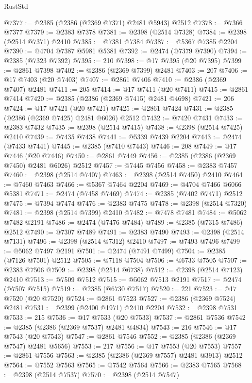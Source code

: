 \begin{lexlean}{RustStd}
\begin{coremodule}
{\begin{coremodule}
{{{{{{{{{{{{{{{{{{{{{{{{{{{{{{{{{{{{{{{{{{{{{{{{{{@7377 := @2385 (@2386 (@2369 @7371) @2481 @5943) @2512
@7378 := @7366 @7377
@7379 := @2383 @7378
@7381 := @2398 (@2514 @7328)
@7384 := @2398 (@2514 @7371) @2410
@7385 := @7381 @7384
@7387 := @5367 @7385 @2204
@7390 := @4704 @7387 @5981 @5381
@7392 := @2474 (@7379 @7390)
@7394 := @2385 (@7323 @7392)
@7395 := 210
@7398 := @17 @7395 (@20 @7395)
@7399 := @2861 @7398
@7402 := @2386 (@2369 @7399) @2481
@7403 := 207
@7406 := @17 @7403 (@20 @7403)
@7407 := @2861 @7406
@7410 := @2386 (@2369 @7407) @2481
@7411 := 205
@7414 := @17 @7411 (@20 @7411)
@7415 := @2861 @7414
@7420 := @2385 (@2386 (@2369 @7415) @2481 @4698)
@7421 := 206
@7424 := @17 @7421 (@20 @7421)
@7425 := @2861 @7424
@7431 := @2385 (@2386 (@2369 @7425) @2481 @6026) @2512
@7432 := @7420 @7431
@7433 := @2383 @7432
@7435 := @2398 (@2514 @7415)
@7438 := @2398 (@2514 @7425) @2410
@7439 := @7435 @7438
@7441 := @5339 @7439 @2204
@7443 := @2474 (@7433 @7441)
@7445 := @2385 (@7410 @7443)
@7446 := 208
@7449 := @17 @7446 (@20 @7446)
@7450 := @2861 @7449
@7456 := @2385 (@2386 (@2369 @7450) @2481 @6026) @2512
@7457 := @7445 @7456
@7458 := @2383 @7457
@7460 := @2398 (@2514 @7407)
@7463 := @2398 (@2514 @7450) @2410
@7464 := @7460 @7463
@7466 := @5367 @7464 @2204
@7469 := @4704 @7466 @6066 @5381
@7471 := @2474 (@7458 @7469)
@7474 := @2385 (@7402 @7471) @2512
@7475 := @7394 @7474
@7476 := @2383 @7475
@7478 := @2398 (@2514 @7320)
@7481 := @2398 (@2514 @7399) @2410
@7482 := @7478 @7481
@7484 := @5062 @7482 @2191
@7486 := @2474 (@7476 @7484)
@7489 := @2385 (@7315 @7486) @2512
@7490 := @7307 @7489
@7491 := @2383 @7490
@7493 := @2398 (@2514 @7131)
@7496 := @2398 (@2514 @7312) @2410
@7497 := @7493 @7496
@7499 := @5062 @7497 @2191
@7501 := @2474 (@7491 @7499)
@7504 := @2385 (@7126 @7501) @2512
@7505 := @7118 @7504
@7506 := @6733 @7505
@7507 := @2383 @7506
@7509 := @2398 (@2514 @6738)
@7512 := @2398 (@2514 @7123) @2410
@7513 := @7509 @7512
@7515 := @5062 @7513 @2191
@7517 := @2474 (@7507 @7515)
@7519 := @2385 (@6730 @7517)
@7520 := 221
@7523 := @17 @7520 (@20 @7520)
@7524 := @2861 @7523
@7527 := @2386 (@2369 @7524) @2481
@7531 := @2399 (@2400 @1971) @2410 @2204
@7532 := @2398 @7531
@7533 := 215
@7536 := @17 @7533 (@20 @7533)
@7537 := @2861 @7536
@7542 := @2385 (@2386 (@2369 @7537) @2481 @4834)
@7543 := 216
@7546 := @17 @7543 (@20 @7543)
@7547 := @2861 @7546
@7552 := @2385 (@2386 (@2369 @7547) @2481 @5656)
@7553 := 217
@7556 := @17 @7553 (@20 @7553)
@7557 := @2861 @7556
@7563 := @2385 (@2386 (@2369 @7557) @2481 @3913) @2512
@7564 := @7552 @7563
@7565 := @7542 @7564
@7566 := @2383 @7565
@7568 := @2398 (@2514 @7537)
@7570 := @2398 (@2514 @7547)
}}}}}}}}}}}}}}}}}}}}}}}}}}}}}}}}}}}}}}}}}}}}}}}}}}
\end{coremodule}}
\end{coremodule}
\end{lexlean}
